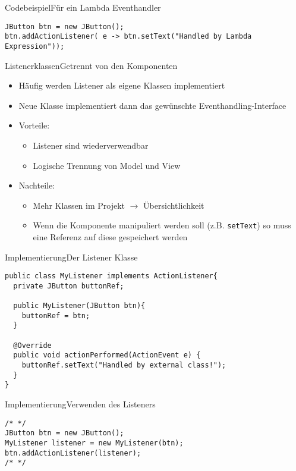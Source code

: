 \begin{frame}[fragile]{Codebeispiel}{Für ein Lambda Eventhandler}
\lstset{style=java}
\begin{lstlisting}
JButton btn = new JButton();
btn.addActionListener( e -> btn.setText("Handled by Lambda Expression"));
\end{lstlisting}
\end{frame}

\begin{frame}{Listenerklassen}{Getrennt von den Komponenten}
    \begin{itemize}
        \item Häufig werden Listener als eigene Klassen implementiert
        \item Neue Klasse implementiert dann das gewünschte Eventhandling-Interface
        \item Vorteile:
        \begin{itemize}
            \item Listener sind wiederverwendbar
            \item Logische Trennung von Model und View
        \end{itemize}
        \item Nachteile:
        \begin{itemize}
            \item Mehr Klassen im Projekt $\rightarrow$ Übersichtlichkeit
            \item Wenn die Komponente manipuliert werden soll (z.B. \texttt{setText}) so muss eine Referenz auf diese gespeichert werden
        \end{itemize}
    \end{itemize}
\end{frame}

\begin{frame}[fragile]{Implementierung}{Der Listener Klasse}
\lstset{style=java}
\begin{lstlisting}
public class MyListener implements ActionListener{
  private JButton buttonRef;
  
  public MyListener(JButton btn){
    buttonRef = btn;
  }
  
  @Override
  public void actionPerformed(ActionEvent e) {
    buttonRef.setText("Handled by external class!");
  }
}
\end{lstlisting}
\end{frame}

\begin{frame}[fragile]{Implementierung}{Verwenden des Listeners}
\lstset{style=java}
\begin{lstlisting}
/* */
JButton btn = new JButton();
MyListener listener = new MyListener(btn);
btn.addActionListener(listener);
/* */
\end{lstlisting}
\end{frame}